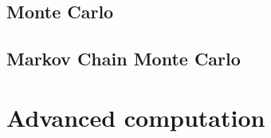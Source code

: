 \documentclass[
]{book}
\theoremstyle{definition}
\theoremstyle{definition}
\theoremstyle{definition}
\theoremstyle{definition}
\theoremstyle{remark}
\begin{document}
\hypertarget{monte-carlo}{%
\section{Monte Carlo}\label{monte-carlo}}

\hypertarget{markov-chain-monte-carlo}{%
\section{Markov Chain Monte Carlo}\label{markov-chain-monte-carlo}}

\hypertarget{advanced-computation}{%
\chapter{Advanced computation}\label{advanced-computation}}

  
\end{document}
